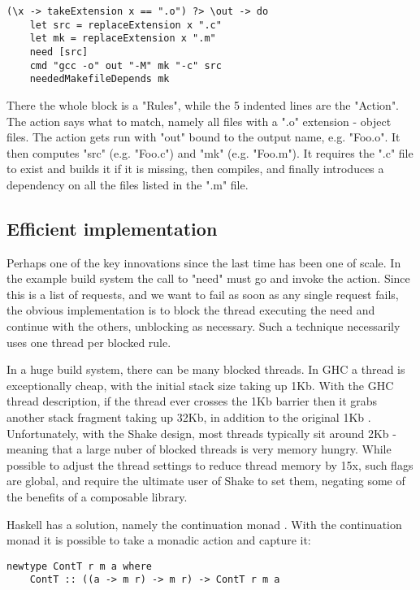 \begin{lstlisting}
(\x -> takeExtension x == ".o") ?> \out -> do
    let src = replaceExtension x ".c"
    let mk = replaceExtension x ".m"
    need [src]
    cmd "gcc -o" out "-M" mk "-c" src
    neededMakefileDepends mk
\end{lstlisting}

There the whole block is a \lst"Rules", while the 5 indented lines are the \lst"Action". The action says what to match, namely all files with a \lst".o" extension - object files. The action gets run with \lst"out" bound to the output name, e.g. \lst"Foo.o". It then computes \lst"src" (e.g. \lst"Foo.c") and \lst"mk" (e.g. \lst"Foo.m"). It requires the \lst".c" file to exist and builds it if it is missing, then compiles, and finally introduces a dependency on all the files listed in the \lst".m" file.

\subsection{Efficient implementation}

Perhaps one of the key innovations since the last time has been one of scale. In the example build system the call to \lst"need" must go and invoke the action. Since this is a list of requests, and we want to fail as soon as any single request fails, the obvious implementation is to block the thread executing the need and continue with the others, unblocking as necessary. Such a technique necessarily uses one thread per blocked rule.

In a huge build system, there can be many blocked threads. In GHC a thread is exceptionally cheap, with the initial stack size taking up 1Kb. With the GHC thread description, if the thread ever crosses the 1Kb barrier then it grabs another stack fragment taking up 32Kb, in addition to the original 1Kb \cite{ghc_threads}. Unfortunately, with the Shake design, most threads typically sit around 2Kb - meaning that a large nuber of blocked threads is very memory hungry. While possible to adjust the thread settings to reduce thread memory by 15x, such flags are global, and require the ultimate user of Shake to set them, negating some of the benefits of a composable library.

Haskell has a solution, namely the continuation monad \cite{cont_paper}. With the continuation monad it is possible to take a monadic action and capture it:

\begin{lstlisting}
newtype ContT r m a where
    ContT :: ((a -> m r) -> m r) -> ContT r m a
\end{lstlisting}

